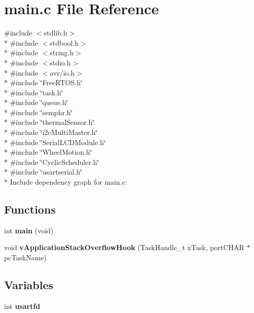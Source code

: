 \section{main.\+c File Reference}
\label{main_8c}
{\ttfamily \#include $<$stdlib.\+h$>$}\\*
{\ttfamily \#include $<$stdbool.\+h$>$}\\*
{\ttfamily \#include $<$string.\+h$>$}\\*
{\ttfamily \#include $<$stdio.\+h$>$}\\*
{\ttfamily \#include $<$avr/io.\+h$>$}\\*
{\ttfamily \#include \char`\"{}Free\+R\+T\+O\+S.\+h\char`\"{}}\\*
{\ttfamily \#include \char`\"{}task.\+h\char`\"{}}\\*
{\ttfamily \#include \char`\"{}queue.\+h\char`\"{}}\\*
{\ttfamily \#include \char`\"{}semphr.\+h\char`\"{}}\\*
{\ttfamily \#include \char`\"{}thermal\+Sensor.\+h\char`\"{}}\\*
{\ttfamily \#include \char`\"{}i2c\+Multi\+Master.\+h\char`\"{}}\\*
{\ttfamily \#include \char`\"{}Serial\+L\+C\+D\+Module.\+h\char`\"{}}\\*
{\ttfamily \#include \char`\"{}Wheel\+Motion.\+h\char`\"{}}\\*
{\ttfamily \#include \char`\"{}Cyclic\+Scheduler.\+h\char`\"{}}\\*
{\ttfamily \#include \char`\"{}usartserial.\+h\char`\"{}}\\*
Include dependency graph for main.\+c\+:
\subsection*{Functions}
\begin{DoxyCompactItemize}
\item 
int {\bf main} (void)
\item 
void {\bf v\+Application\+Stack\+Overflow\+Hook} (Task\+Handle\+\_\+t x\+Task, port\+C\+H\+AR $\ast$pc\+Task\+Name)
\end{DoxyCompactItemize}
\subsection*{Variables}
\begin{DoxyCompactItemize}
\item 
int {\bf usartfd}
\end{DoxyCompactItemize}


